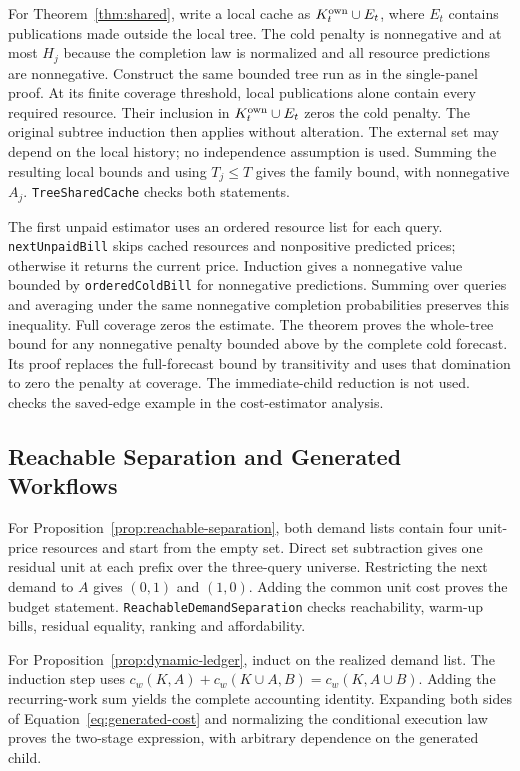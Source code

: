For Theorem~\ref{thm:shared}, write a local cache as $K^{\rm own}_t\cup E_t$,
where $E_t$ contains publications made outside the local tree. The cold penalty
is nonnegative and at most $H_j$ because the completion law is normalized and
all resource predictions are nonnegative. Construct the same bounded tree run
as in the single-panel proof. At its finite coverage threshold, local
publications alone contain every required resource. Their inclusion in
$K^{\rm own}_t\cup E_t$ zeros the cold penalty. The original subtree induction
then applies without alteration. The external set may depend on the local
history; no independence assumption is used. Summing the resulting local
bounds and using $T_j\le T$ gives the family bound, with nonnegative $A_j$.
\texttt{TreeSharedCache} checks both statements.

The first unpaid estimator uses an ordered resource list for each query.
\texttt{nextUnpaidBill} skips cached resources and nonpositive predicted
prices; otherwise it returns the current price. Induction gives a nonnegative
value bounded by \texttt{orderedColdBill} for nonnegative predictions. Summing
over queries and averaging under the same nonnegative completion probabilities
preserves this inequality. Full coverage zeros the estimate. The theorem
 proves the whole-tree bound
for any nonnegative penalty bounded above by the complete cold forecast.
Its proof replaces the full-forecast bound by transitivity and uses that
domination to zero the penalty at coverage. The immediate-child reduction
is not used.  checks the
saved-edge example in the cost-estimator analysis.

\subsection{Reachable Separation and Generated Workflows}
For Proposition~\ref{prop:reachable-separation}, both demand lists contain four
unit-price resources and start from the empty set. Direct set subtraction gives
one residual unit at each prefix over the three-query universe. Restricting
the next demand to $A$ gives $(0,1)$ and $(1,0)$. Adding the common unit cost
proves the budget statement. \texttt{ReachableDemandSeparation} checks
reachability, warm-up bills, residual equality, ranking and affordability.

For Proposition~\ref{prop:dynamic-ledger}, induct on the realized demand list.
The induction step uses $c_w(K,A)+c_w(K\cup A,B)=c_w(K,A\cup B)$.
Adding the recurring-work sum yields the complete accounting identity.
Expanding both sides of Equation~\eqref{eq:generated-cost} and normalizing the
conditional execution law proves the two-stage expression, with arbitrary
dependence on the generated child.


